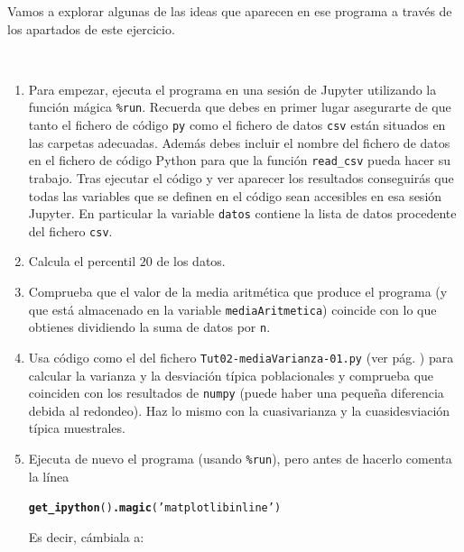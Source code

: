 \documentclass[10pt,a4paper]{article}\usepackage[]{graphicx}\usepackage[]{color}
\makeatletter
\newcommand{\hlstr}[1]{\textcolor[rgb]{0.192,0.494,0.8}{#1}}%
\newcommand{\hlkwd}[1]{\textcolor[rgb]{0.737,0.353,0.396}{\textbf{#1}}}%
\newenvironment{kframe}{%
 \def\at@end@of@kframe{}%
 \ifinner\ifhmode%
  \def\at@end@of@kframe{\end{minipage}}%
  \begin{minipage}{\columnwidth}%
 \fi\fi%
 \def\FrameCommand##1{\hskip\@totalleftmargin \hskip-\fboxsep
 \colorbox{shadecolor}{##1}\hskip-\fboxsep
     \hskip-\linewidth \hskip-\@totalleftmargin \hskip\columnwidth}%
 \MakeFramed {\advance\hsize-\width
   \@totalleftmargin\z@ \linewidth\hsize
   \@setminipage}}%
 {\par\unskip\endMakeFramed%
 \at@end@of@kframe}
\newenvironment{knitrout}{}{} %
\newcounter {cont01}
\makeatother
\begin{document}
Vamos a explorar algunas de las ideas que aparecen en ese programa a través de los apartados de este ejercicio.
\begin{ejercicio}
\label{tut02:ejercicio26}
\quad\\
\begin{enumerate}
\item Para empezar, ejecuta el programa en una sesión de Jupyter utilizando la función mágica \verb&%run&.
Recuerda que debes en primer lugar asegurarte de que tanto el fichero de código {\tt py} como el fichero de datos {\tt csv} están situados en las carpetas adecuadas. Además debes incluir el nombre del fichero de datos en el fichero de código Python para que la función \verb&read_csv& pueda hacer su trabajo.  Tras ejecutar el código y ver aparecer los resultados conseguirás que todas las variables que se definen en el código sean accesibles en esa sesión Jupyter. En particular la variable {\tt datos} contiene la lista de datos procedente del fichero {\tt csv}.
\item Calcula el percentil $20$ de los datos.
\item Comprueba que el valor de la media aritmética que produce el programa (y que está almacenado en la variable {\tt mediaAritmetica}) coincide con lo que obtienes dividiendo la suma de datos por {\tt n}.
\item Usa código como el del fichero {\tt Tut02-mediaVarianza-01.py} (ver pág. \pageref{fichero:Tut02-mediaVarianza-01}) para calcular la varianza y la desviación típica poblacionales y comprueba que coinciden con los resultados de {\tt numpy} (puede haber una pequeña diferencia debida al redondeo). Haz lo mismo con la cuasivarianza y la cuasidesviación típica muestrales.
\item Ejecuta de nuevo el programa (usando \verb&%run&),
pero antes de hacerlo comenta la línea
\begin{knitrout}
\color{fgcolor}\begin{kframe}
\begin{alltt}
\hlkwd{get_ipython}()\hlkwd{.magic}(\hlstr{'matplotlib inline'})
\end{alltt}
\end{kframe}
\end{knitrout}
Es decir, cámbiala a:
\begin{knitrout}
\color{fgcolor}\begin{kframe}
\begin{alltt}

\end{alltt}
\end{kframe}
\end{knitrout}
\end{enumerate}
\end{ejercicio}
\end{document}
